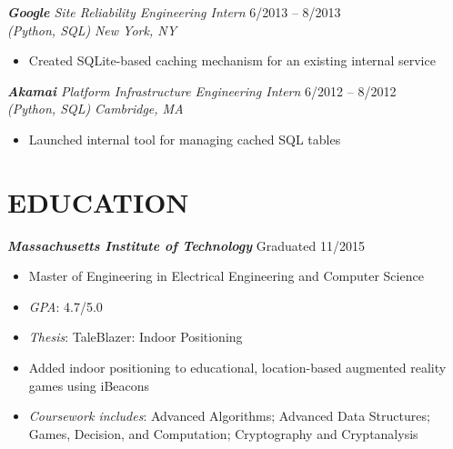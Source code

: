 \documentclass[margin]{res}
\begin{document}
\begin{resume}
                    {\sl{\bf Google} Site Reliability Engineering Intern} 
                    \hfill 6/2013 -- 8/2013 \\
                    {\sl (Python, SQL)}
                    \hfill {\sl  New York, NY}
                    \begin{itemize} \itemsep -2pt %
                        \setlength{\topsep}{0pt}
                         \item Created SQLite-based
                           caching mechanism for an existing internal service
                    \end{itemize} 

                    {\sl {\bf Akamai} 
                      Platform Infrastructure Engineering Intern} 
                    \hfill 6/2012 -- 8/2012 \\
                    {\sl (Python, SQL)}
                    \hfill {\sl Cambridge, MA}
                    \begin{itemize} \itemsep -2pt %
                         \item Launched internal tool for managing cached SQL
                           tables
                    \end{itemize}

\section{EDUCATION} {\sl \bf Massachusetts Institute of Technology} 
                    \hfill Graduated 11/2015
                    \begin{itemize} \itemsep -2pt %
                        \item Master of Engineering in Electrical Engineering
                          and Computer Science
                        \item {\sl GPA}: 4.7/5.0
                        \item {\sl Thesis}: TaleBlazer: Indoor Positioning
                        \item Added indoor positioning to
                          educational, location-based augmented reality games
                          using iBeacons
                        \item {\sl Coursework includes}:
                          Advanced Algorithms;
                          Advanced Data Structures;
                          Games, Decision, and Computation;
                          Cryptography and Cryptanalysis
                    \end{itemize}


\end{resume}
\end{document}
